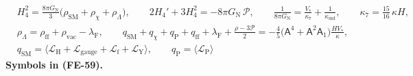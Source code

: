 \documentclass[
  10pt,
]{article}
\begin{document}
\[
\begin{aligned}
&H_4^2 = \frac{8\pi G_{\mathrm{N}}}{3}\big(\rho_{\mathrm{SM}} + \rho_\chi + \rho_\Lambda\big),\qquad
 2H_4' + 3H_4^2 = -8\pi G_{\mathrm{N}}\,\mathcal{P},\qquad
 \frac{1}{8\pi G_{\mathrm{N}}} = \frac{V_*}{\kappa_7} + \frac{1}{\kappa_{\mathrm{ind}}},\qquad \kappa_7 = \frac{15}{16}\,\kappa H,\\
&\rho_\Lambda = \rho_{\mathrm{ff}} + \rho_{\mathrm{vac}} - \lambda_{\mathrm{F}},\qquad
 q_{\mathrm{SM}} + q_\chi + q_{\mathrm{P}} + q_{\mathrm{ff}} + \lambda_{\mathrm{F}} + \frac{\rho - 3\mathcal{P}}{2}
 = -\frac45\big(\mathsf{A}^4 + \mathsf{A}^2\mathsf{A}_1\big)\frac{HV_*}{\kappa},\\
&q_{\mathrm{SM}} = \big\langle\mathcal{L}_{\mathrm{H}} + \mathcal{L}_{\mathrm{gauge}} + \mathcal{L}_{\mathrm{f}} + \mathcal{L}_{\mathrm{Y}}\big\rangle,\qquad
 q_{\mathrm{P}} = \langle\mathcal{L}_{\mathrm{P}}\rangle
\end{aligned} \tag{FE-59}
\] \textbf{Symbols in (FE-59).}
\end{document}
